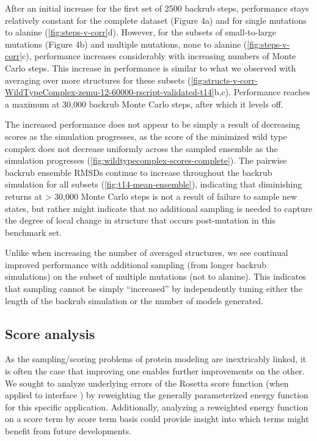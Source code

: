 After an initial increase for the first set of 2500 backrub steps, performance stays relatively constant for the complete dataset (Figure 4a) and for single mutations to alanine (\cref{fig:steps-v-corr}d). However, for the subsets of small-to-large mutations (Figure 4b) and multiple mutations, none to alanine (\cref{fig:steps-v-corr}c), performance increases considerably with increasing numbers of Monte Carlo steps. This increase in performance is similar to what we observed with averaging over more structures for these subsets (\cref{fig:structs-v-corr-WildTypeComplex-zemu-12-60000-rscript-validated-t14}b,c).
Performance reaches a maximum at 30,000 backrub Monte Carlo steps, after which it levels off.

The increased performance does not appear to be simply a result of decreasing scores as the simulation progresses, as the score of the minimized wild type complex does not decrease uniformly across the sampled ensemble as the simulation progresses (\cref{fig:wildtypecomplex-scores-complete}).
The pairwise backrub ensemble RMSDs continue to increase throughout the backrub simulation for all subsets (\cref{fig:t14-mean-ensemble}), indicating that diminishing returns at > 30,000 Monte Carlo steps is not a result of failure to sample new states, but rather might indicate that no additional sampling is needed to capture the degree of local change in structure that occurs post-mutation in this benchmark set.

Unlike when increasing the number of averaged structures, we see continual improved performance with additional sampling (from longer backrub simulations) on the subset of multiple mutations (not to alanine).
This indicates that sampling cannot be simply ``increased'' by independently tuning either the length of the backrub simulation or the number of models generated. %

\subsection{Score analysis}

As the sampling/scoring problems of protein modeling are inextricably linked, it is often the case that improving one enables further improvements on the other.
We sought to analyze underlying errors of the Rosetta score function (when applied to interface \ddg) by reweighting the generally parameterized energy function for this specific application.
Additionally, analyzing a reweighted energy function on a score term by score term basis could provide insight into which terms might benefit from future developments.


